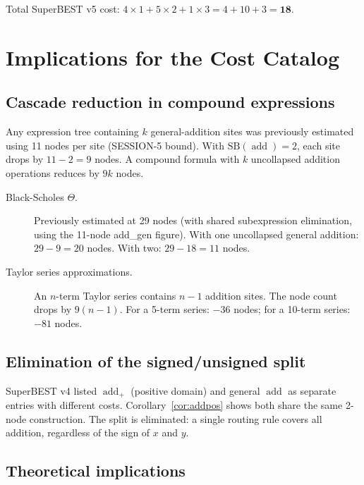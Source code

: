 \documentclass[12pt,a4paper]{article}
\theoremstyle{definition}
\newcommand{\addop}{\operatorname{add}}
\newcommand{\SB}{\mathrm{SB}}
\begin{document}
Total SuperBEST v5 cost: $4 \times 1 + 5 \times 2 + 1 \times 3 = 4 + 10 + 3 = \mathbf{18}$.

\section{Implications for the Cost Catalog}
\label{sec:implications}

\subsection{Cascade reduction in compound expressions}

Any expression tree containing $k$ general-addition sites was previously
estimated using 11 nodes per site (SESSION-5 bound).
With $\SB(\addop) = 2$, each site drops by $11 - 2 = 9$ nodes.
A compound formula with $k$ uncollapsed addition operations reduces by $9k$ nodes.

\begin{description}
  \item[Black-Scholes $\Theta$.]
    Previously estimated at 29 nodes (with shared subexpression elimination,
    using the 11-node add\_gen figure).
    With one uncollapsed general addition: $29 - 9 = 20$ nodes.
    With two: $29 - 18 = 11$ nodes.
  \item[Taylor series approximations.]
    An $n$-term Taylor series contains $n-1$ addition sites.
    The node count drops by $9(n-1)$.
    For a 5-term series: $-36$ nodes; for a 10-term series: $-81$ nodes.
\end{description}

\subsection{Elimination of the signed/unsigned split}

SuperBEST v4 listed $\addop_+$ (positive domain) and general $\addop$ as
separate entries with different costs.
Corollary~\ref{cor:addpos} shows both share the same 2-node construction.
The split is eliminated: a single routing rule covers all addition, regardless
of the sign of $x$ and $y$.

\subsection{Theoretical implications}
\end{document}

